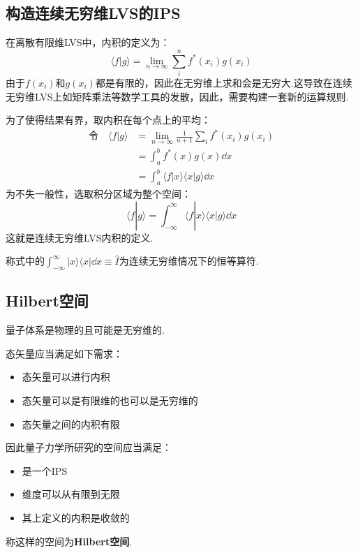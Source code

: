 \subsection{构造连续无穷维LVS的IPS}
在离散有限维LVS中，内积的定义为：
$$\langle f | g \rangle = \lim_{n \to \infty} \sum^{n}_{i} f^*(x_i)g(x_i)$$
由于$f(x_i)$和$g(x_i)$都是有限的，因此在无穷维上求和会是无穷大.这导致在连续无穷维LVS上如矩阵乘法等数学工具的发散，因此，需要构建一套新的运算规则.
\begin{derivation}
    为了使得结果有界，取内积在每个点上的平均：
    \begin{align*}
        \text{令} \quad \langle f|g \rangle &= \lim_{n \to \infty} \frac{1}{n+1} \sum_{i} f^*(x_i) g(x_i) \\
        &= \int_a^b f^*(x) g(x) \dd{x} \\
        &= \int_a^b \langle f|x \rangle \langle x|g \rangle \dd{x}
    \end{align*}
    为不失一般性，选取积分区域为整个空间：
    $$\langle f|g \rangle = \int_{-\infty}^{\infty} \langle f|x \rangle \langle x|g \rangle \dd{x}$$
    这就是连续无穷维LVS内积的定义.

    称式中的$\int_{-\infty}^{\infty} |x \rangle \langle x| \dd{x} \equiv \hat{I}$为连续无穷维情况下的恒等算符.
\end{derivation}

\subsection{Hilbert空间}
量子体系是物理的且可能是无穷维的.

态矢量应当满足如下需求：

\begin{itemize}
    \item 态矢量可以进行内积
    \item 态矢量可以是有限维的也可以是无穷维的
    \item 态矢量之间的内积有限
\end{itemize}

因此量子力学所研究的空间应当满足：

\begin{itemize}
    \item 是一个IPS
    \item 维度可以从有限到无限
    \item 其上定义的内积是收敛的
\end{itemize}

称这样的空间为\textbf{Hilbert空间}.

